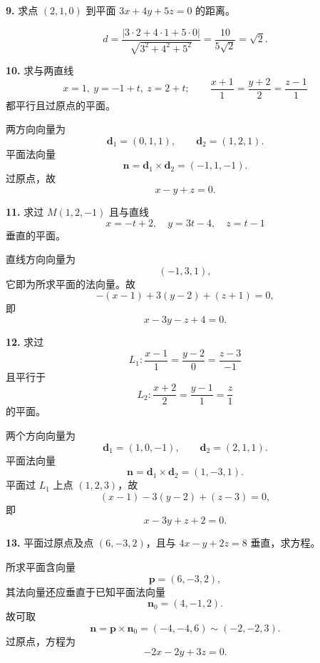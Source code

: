 \begin{problemblock}
\textbf{9.} 求点 \((2,1,0)\) 到平面 \(3x+4y+5z=0\) 的距离。
\end{problemblock}
\begin{solutionblock}
\[
d=\frac{|3\cdot2+4\cdot1+5\cdot0|}{\sqrt{3^2+4^2+5^2}}
=\frac{10}{5\sqrt2}
=\boxed{\sqrt2}.
\]
\end{solutionblock}

\begin{problemblock}
\textbf{10.} 求与两直线
\[
x=1,\ y=-1+t,\ z=2+t;\qquad
\frac{x+1}{1}=\frac{y+2}{2}=\frac{z-1}{1}
\]
都平行且过原点的平面。
\end{problemblock}
\begin{solutionblock}
两方向向量为
\[
\boldsymbol d_1=(0,1,1),\qquad \boldsymbol d_2=(1,2,1).
\]
平面法向量
\[
\boldsymbol n=\boldsymbol d_1\times\boldsymbol d_2=(-1,1,-1).
\]
过原点，故
\[
\boxed{x-y+z=0}.
\]
\end{solutionblock}

\begin{problemblock}
\textbf{11.} 求过 \(M(1,2,-1)\) 且与直线
\[
x=-t+2,\quad y=3t-4,\quad z=t-1
\]
垂直的平面。
\end{problemblock}
\begin{solutionblock}
直线方向向量为
\[
(-1,3,1),
\]
它即为所求平面的法向量。故
\[
-(x-1)+3(y-2)+(z+1)=0,
\]
即
\[
\boxed{x-3y-z+4=0}.
\]
\end{solutionblock}

\begin{problemblock}
\textbf{12.} 求过
\[
L_1:\frac{x-1}{1}=\frac{y-2}{0}=\frac{z-3}{-1}
\]
且平行于
\[
L_2:\frac{x+2}{2}=\frac{y-1}{1}=\frac{z}{1}
\]
的平面。
\end{problemblock}
\begin{solutionblock}
两个方向向量为
\[
\boldsymbol d_1=(1,0,-1),\qquad \boldsymbol d_2=(2,1,1).
\]
平面法向量
\[
\boldsymbol n=\boldsymbol d_1\times\boldsymbol d_2=(1,-3,1).
\]
平面过 \(L_1\) 上点 \((1,2,3)\)，故
\[
(x-1)-3(y-2)+(z-3)=0,
\]
即
\[
\boxed{x-3y+z+2=0}.
\]
\end{solutionblock}

\begin{problemblock}
\textbf{13.} 平面过原点及点 \((6,-3,2)\)，且与 \(4x-y+2z=8\) 垂直，求方程。
\end{problemblock}
\begin{solutionblock}
所求平面含向量
\[
\boldsymbol p=(6,-3,2),
\]
其法向量还应垂直于已知平面法向量
\[
\boldsymbol n_0=(4,-1,2).
\]
故可取
\[
\boldsymbol n=\boldsymbol p\times\boldsymbol n_0=(-4,-4,6)\sim(-2,-2,3).
\]
过原点，方程为
\[
\boxed{-2x-2y+3z=0}.
\]
\end{solutionblock}

